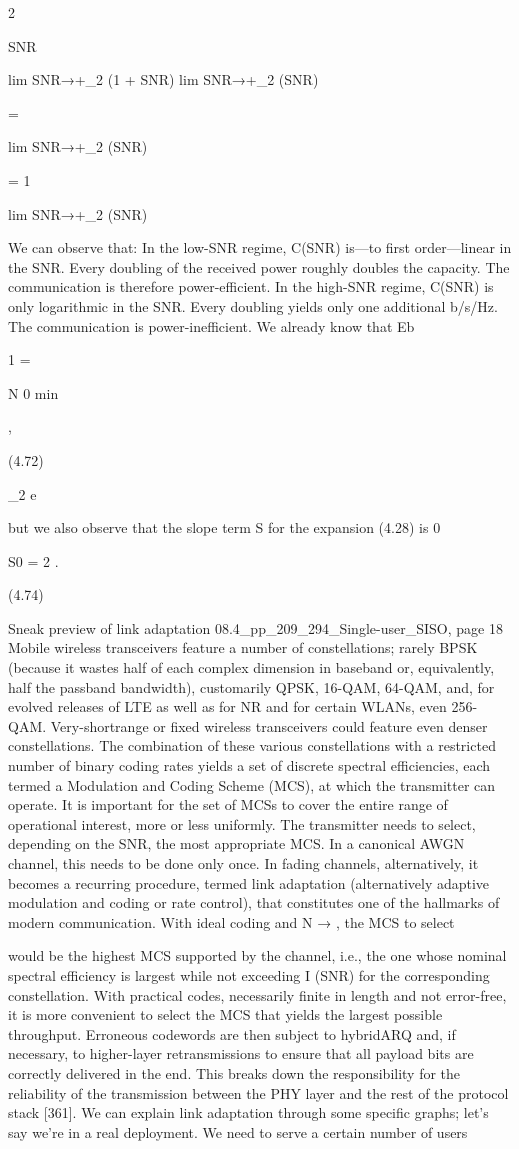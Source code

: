 {{{{{2

SNR

lim SNR→+\infty \log_2 (1 + SNR)
lim SNR→+\infty \log_2 (SNR)

=

lim SNR→+\infty \log_2 (SNR)

= 1

lim SNR→+\infty \log_2 (SNR)

We can observe that:
In the low-SNR regime, C(SNR) is—to first order—linear in the SNR. Every doubling of the received power roughly doubles the capacity. The communication is therefore power-efficient.
In the high-SNR regime, C(SNR) is only logarithmic in the SNR. Every doubling yields only one additional b/s/Hz. The communication is power-inefficient.
We already know that Eb

1
=

N 0 min

,

(4.72)

\log_2 e

but we also observe that the slope term S for the expansion (4.28) is 0

S0 = 2 .

(4.74)

Sneak preview of link adaptation 08.4_pp_209_294_Single-user_SISO, page 18 Mobile wireless transceivers feature a number of constellations; rarely BPSK
(because it wastes half of each complex dimension in baseband or, equivalently, half the passband bandwidth), customarily QPSK, 16-QAM, 64-QAM, and, for evolved releases of LTE as well as for NR and for certain WLANs, even 256-QAM. Very-shortrange or fixed wireless transceivers could feature even denser constellations. The combination of these various constellations with a restricted number of binary coding rates yields a set of discrete spectral efficiencies, each termed a Modulation and Coding Scheme (MCS), at which the transmitter can operate. It is important for the set of MCSs to cover the entire range of operational interest, more or less uniformly.
The transmitter needs to select, depending on the SNR, the most appropriate MCS. In a canonical AWGN channel, this needs to be done only once. In fading channels,
alternatively, it becomes a recurring procedure, termed link adaptation (alternatively adaptive modulation and coding or rate control), that constitutes one of the hallmarks of modern communication. With ideal coding and N → \infty, the MCS to select

would be the highest MCS supported by the channel, i.e., the one whose nominal spectral efficiency is largest while not exceeding I (SNR) for the corresponding constellation. With practical codes, necessarily finite in length and not error-free, it is more convenient to select the MCS that yields the largest possible throughput.
Erroneous codewords are then subject to hybridARQ and, if necessary, to higher-layer retransmissions to ensure that all payload bits are correctly delivered in the end.
This breaks down the responsibility for the reliability of the transmission between the PHY layer and the rest of the protocol stack [361].
We can explain link adaptation through some specific graphs; let's say we're in a real deployment. We need to serve a certain number of users

}}}}}
